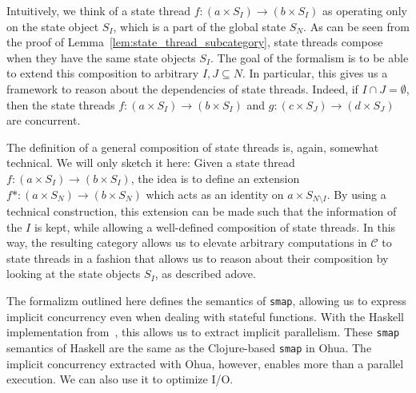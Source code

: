Intuitively, we think of a state thread $f : (a \times S_I) \rightarrow (b \times S_I)$ as operating only on the state object $S_I$, which is a part of the global state $S_N$.
As can be seen from the proof of Lemma~\ref{lem:state_thread_subcategory}, state threads compose when they have the same state objects $S_I$.
The goal of the formalism is to be able to extend this composition to arbitrary $I,J \subseteq N$.
In particular, this gives us a framework to reason about the dependencies of state threads.
Indeed, if $I \cap J = \emptyset$, then the state threads $f : (a \times S_I) \rightarrow (b \times S_I)$ and $g : (c \times S_J) \rightarrow (d \times S_J)$ are concurrent.

The definition of a general composition of state threads is, again, somewhat technical. We will only sketch it here: Given a state thread $f : (a \times S_I) \rightarrow (b \times S_I)$,
the idea is to define an extension $f* : (a \times S_N) \rightarrow (b \times S_N)$ which acts as an identity on $a \times S_{N \setminus I}$. 
By using a technical construction, this extension can be made such that the information of the $I$ is kept, while allowing a well-defined composition of state threads.
In this way, the resulting category allows us to elevate arbitrary computations in $\mathcal{C}$ to state threads in a fashion that allows us to reason about their composition by looking at the state objects $S_I$,
as described adove.

The formalizm outlined here defines the semantics of \texttt{smap}, allowing us to express implicit concurrency even when dealing with stateful functions.
With the Haskell implementation from~\cite{ertel_haskell19}, this allows us to extract implicit parallelism.
These \texttt{smap} semantics of Haskell are the same as the Clojure-based \texttt{smap} in Ohua.
The implicit concurrency extracted with Ohua, however, enables more than a parallel execution.
We can also use it to optimize \ac{I/O}.